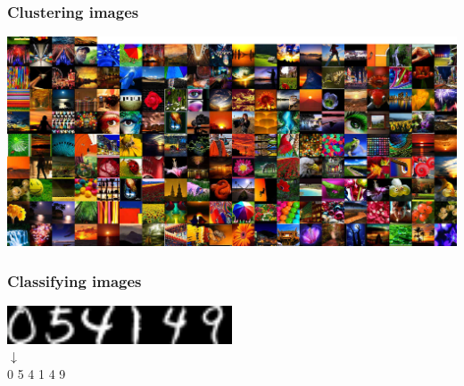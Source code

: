 \begin{frame}
  \frametitle{Clustering images}

  \begin{center}
  \includegraphics[width=\textwidth]{../../code/image_data/flickr_vivid_cluster_0.png}
  \end{center}

\end{frame}


\begin{frame}
  \frametitle{Classifying images}

  \begin{center}
    \includegraphics[width=0.5\textwidth]{ocr.png} \\
  \Huge{$\downarrow$} \\
  \Huge{0 \hskip10pt 5 \hskip10pt 4 \hskip10pt 1 \hskip10pt 4 \hskip10pt 9}
  \end{center}

\end{frame}
